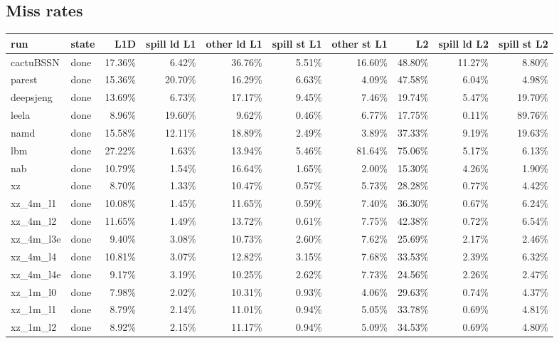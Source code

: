 \documentclass[10pt,a4paper,landscape]{article}
\begin{document}
\subsection*{Miss rates}
{\footnotesize
\begin{longtable}{llrrrrrrrr}
\toprule
run & state & L1D & spill ld L1 & other ld L1 & spill st L1 & other st L1 & L2 & spill ld L2 & spill st L2 \\
\midrule
\endhead
\bottomrule
\endfoot
cactuBSSN & done & 17.36\% & 6.42\% & 36.76\% & 5.51\% & 16.60\% & 48.80\% & 11.27\% & 8.80\% \\
parest & done & 15.36\% & 20.70\% & 16.29\% & 6.63\% & 4.09\% & 47.58\% & 6.04\% & 4.98\% \\
deepsjeng & done & 13.69\% & 6.73\% & 17.17\% & 9.45\% & 7.46\% & 19.74\% & 5.47\% & 19.70\% \\
leela & done & 8.96\% & 19.60\% & 9.62\% & 0.46\% & 6.77\% & 17.75\% & 0.11\% & 89.76\% \\
namd & done & 15.58\% & 12.11\% & 18.89\% & 2.49\% & 3.89\% & 37.33\% & 9.19\% & 19.63\% \\
lbm & done & 27.22\% & 1.63\% & 13.94\% & 5.46\% & 81.64\% & 75.06\% & 5.17\% & 6.13\% \\
nab & done & 10.79\% & 1.54\% & 16.64\% & 1.65\% & 2.00\% & 15.30\% & 4.26\% & 1.90\% \\
xz & done & 8.70\% & 1.33\% & 10.47\% & 0.57\% & 5.73\% & 28.28\% & 0.77\% & 4.42\% \\
xz\_4m\_l1 & done & 10.08\% & 1.45\% & 11.65\% & 0.59\% & 7.40\% & 36.30\% & 0.67\% & 6.24\% \\
xz\_4m\_l2 & done & 11.65\% & 1.49\% & 13.72\% & 0.61\% & 7.75\% & 42.38\% & 0.72\% & 6.54\% \\
xz\_4m\_l3e & done & 9.40\% & 3.08\% & 10.73\% & 2.60\% & 7.62\% & 25.69\% & 2.17\% & 2.46\% \\
xz\_4m\_l4 & done & 10.81\% & 3.07\% & 12.82\% & 3.15\% & 7.68\% & 33.53\% & 2.39\% & 6.32\% \\
xz\_4m\_l4e & done & 9.17\% & 3.19\% & 10.25\% & 2.62\% & 7.73\% & 24.56\% & 2.26\% & 2.47\% \\
xz\_1m\_l0 & done & 7.98\% & 2.02\% & 10.31\% & 0.93\% & 4.06\% & 29.63\% & 0.74\% & 4.37\% \\
xz\_1m\_l1 & done & 8.79\% & 2.14\% & 11.01\% & 0.94\% & 5.05\% & 33.78\% & 0.69\% & 4.81\% \\
xz\_1m\_l2 & done & 8.92\% & 2.15\% & 11.17\% & 0.94\% & 5.09\% & 34.53\% & 0.69\% & 4.80\% \\

\end{longtable}}
\end{document}

